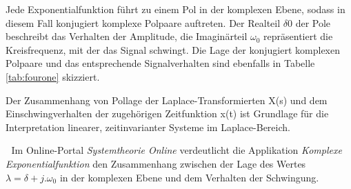\noindent Jede Exponentialfunktion führt zu einem Pol in der komplexen Ebene, sodass in diesem Fall konjugiert komplexe Polpaare auftreten. Der Realteil $\delta{0}$ der Pole beschreibt das Verhalten der Amplitude, die Imagin\"{a}rteil $\omega _{0}$ repräsentiert die Kreisfrequenz, mit der das Signal schwingt. Die Lage der konjugiert komplexen Polpaare und das entsprechende Signalverhalten sind ebenfalls in Tabelle \ref{tab:fourone} skizziert.\medskip

\noindent Der Zusammenhang von Pollage der Laplace-Transformierten X(s) und dem Einschwingverhalten der zugehörigen Zeitfunktion x(t) ist Grundlage für die Interpretation linearer, zeitinvarianter Systeme im Laplace-Bereich.

\textcolor{white}{.}\newline
\noindent Im Online-Portal \textit{Systemtheorie Online} verdeutlicht die Applikation \textit{Komplexe Exponentialfunktion} den Zusammenhang zwischen der Lage des Wertes $\lambda = \delta + j.\omega{}_{0}$ in der komplexen Ebene und dem Verhalten der Schwingung.\newline

\clearpage

